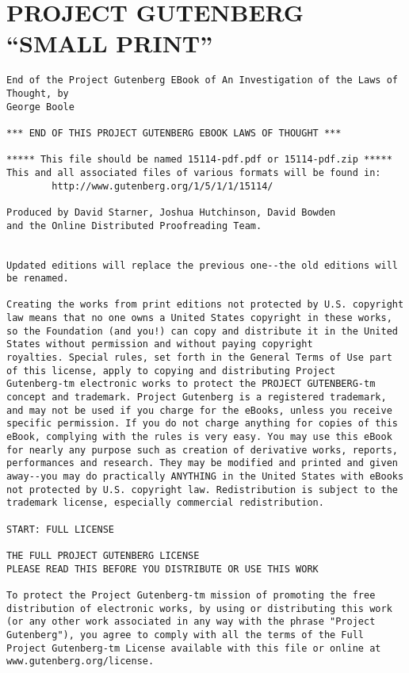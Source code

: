 \documentclass[oneside]{book}
\begin{document}
\chapter{PROJECT GUTENBERG ``SMALL PRINT''}
\small {}
\begin{verbatim}
End of the Project Gutenberg EBook of An Investigation of the Laws of Thought, by 
George Boole

*** END OF THIS PROJECT GUTENBERG EBOOK LAWS OF THOUGHT ***

***** This file should be named 15114-pdf.pdf or 15114-pdf.zip *****
This and all associated files of various formats will be found in:
        http://www.gutenberg.org/1/5/1/1/15114/

Produced by David Starner, Joshua Hutchinson, David Bowden
and the Online Distributed Proofreading Team.


Updated editions will replace the previous one--the old editions will
be renamed.

Creating the works from print editions not protected by U.S. copyright
law means that no one owns a United States copyright in these works,
so the Foundation (and you!) can copy and distribute it in the United
States without permission and without paying copyright
royalties. Special rules, set forth in the General Terms of Use part
of this license, apply to copying and distributing Project
Gutenberg-tm electronic works to protect the PROJECT GUTENBERG-tm
concept and trademark. Project Gutenberg is a registered trademark,
and may not be used if you charge for the eBooks, unless you receive
specific permission. If you do not charge anything for copies of this
eBook, complying with the rules is very easy. You may use this eBook
for nearly any purpose such as creation of derivative works, reports,
performances and research. They may be modified and printed and given
away--you may do practically ANYTHING in the United States with eBooks
not protected by U.S. copyright law. Redistribution is subject to the
trademark license, especially commercial redistribution.

START: FULL LICENSE

THE FULL PROJECT GUTENBERG LICENSE
PLEASE READ THIS BEFORE YOU DISTRIBUTE OR USE THIS WORK

To protect the Project Gutenberg-tm mission of promoting the free
distribution of electronic works, by using or distributing this work
(or any other work associated in any way with the phrase "Project
Gutenberg"), you agree to comply with all the terms of the Full
Project Gutenberg-tm License available with this file or online at
www.gutenberg.org/license.


\end{verbatim}
\end{document}
